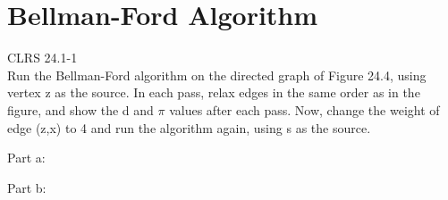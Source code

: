 \documentclass[12pt]{article}%
\begin{document}
\section{Bellman-Ford Algorithm}
CLRS 24.1-1\\
Run the Bellman-Ford algorithm on the directed graph of Figure 24.4, using vertex z as the source. In each pass, relax edges in the same order as in the figure, and
show the d and $\pi$ values after each pass. Now, change the weight of edge (z,x)
to 4 and run the algorithm again, using s as the source.




Part a:
\begin{center}
\end{center}

Part b:
\begin{center}
\end{center}
\end{document}
